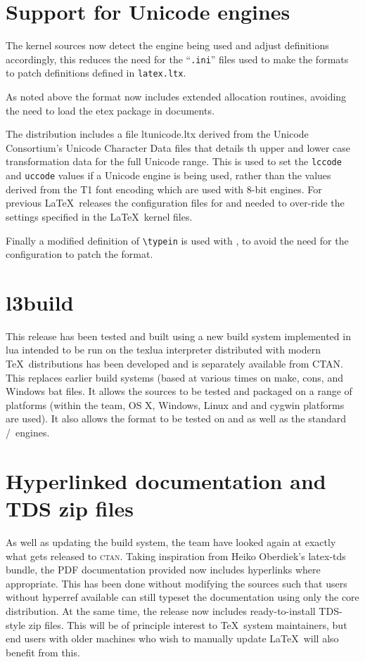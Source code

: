 \documentclass{ltnews}
\begin{document}
\section{Support for Unicode engines}

The kernel sources now detect the engine being used and adjust definitions
accordingly, this reduces the need for the ``\texttt{.ini}'' files used to make
the formats to patch definitions defined in \texttt{latex.ltx}.
 
As noted above the format now includes extended allocation routines, avoiding
the need to load the \textsf{etex} package in documents.

The distribution includes a file \textsf{ltunicode.ltx} derived from the
Unicode Consortium's Unicode Character Data files that details th upper and
lower case transformation data for the full Unicode range. This is used to set
the \verb|lccode| and \verb|uccode| values if a Unicode engine is being used,
rather than the values derived from the T1 font encoding which are used with
8-bit engines. For previous \LaTeX\ releases the configuration files for
 and  needed to over-ride the settings specified
in the \LaTeX\ kernel files.

Finally a modified definition of \verb|\typein| is used with , to
avoid the need for the  configuration to patch the format.

\section{l3build}

This release has been tested and built using a new build system implemented in
\textsf{lua} intended to be run on the \textsf{texlua} interpreter distributed
with modern \TeX\ distributions has been developed and is separately available
from CTAN. This replaces earlier build systems (based at various times on
\textsf{make}, \textsf{cons}, and Windows \textsf{bat} files. It allows the
sources to be tested and packaged on a range of platforms (within the team,
OS X, Windows, Linux and and cygwin platforms are used). It also allows the
format to be tested on  and  as well as the
standard /\eTeX\ engines.

\section{Hyperlinked documentation and TDS zip files}

As well as updating the build system, the team have looked again at exactly
what gets released to \textsc{ctan}. Taking inspiration from Heiko Oberdiek's
\textsf{latex-tds} bundle, the PDF documentation provided now includes
hyperlinks where appropriate. This has been done without modifying the sources
such that users without \textsf{hyperref} available can still typeset the
documentation using only the core distribution. At the same time, the release
now includes ready-to-install TDS-style zip files. This will be of principle
interest to \TeX\ system maintainers, but end users with older machines who
wish to manually update \LaTeX\ will also benefit from this.
\end{document}
